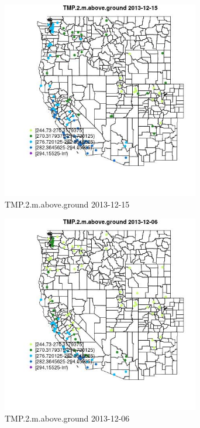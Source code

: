 \begin{figure} 
\centering  
\includegraphics[width=0.77\textwidth]{Code_Outputs/Report_ML_input_PM25_Step4_part_e_de_duplicated_aves_MapObsTMP2maboveground2013-12-15.jpg} 
\caption{\label{fig:Report_ML_input_PM25_Step4_part_e_de_duplicated_avesMapObsTMP2maboveground2013-12-15}TMP.2.m.above.ground 2013-12-15} 
\end{figure} 
 

\begin{figure} 
\centering  
\includegraphics[width=0.77\textwidth]{Code_Outputs/Report_ML_input_PM25_Step4_part_e_de_duplicated_aves_MapObsTMP2maboveground2013-12-06.jpg} 
\caption{\label{fig:Report_ML_input_PM25_Step4_part_e_de_duplicated_avesMapObsTMP2maboveground2013-12-06}TMP.2.m.above.ground 2013-12-06} 
\end{figure} 
 
